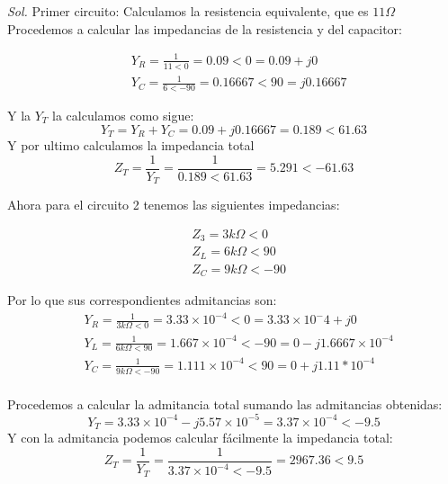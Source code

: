 \begin{enumerate}
	      \textit{ Sol. }
	      Primer circuito:
	      Calculamos la resistencia equivalente, que es $11\Omega$
	      Procedemos a calcular las impedancias de la resistencia y del capacitor:

	      \begin{align*}
		       & Y_R=\frac{1}{11<0}=0.09<0=0.09+j0       \\
		       & Y_C=\frac{1}{6<-90}=0.16667<90=j0.16667
	      \end{align*}

	      Y la $Y_T$ la calculamos como sigue:
	      \begin{equation}
		      Y_T=Y_R+Y_C=0.09+j0.16667=0.189<61.63
	      \end{equation}
	      Y por ultimo calculamos la impedancia total
	      \begin{equation}
		      Z_T=\frac{1}{Y_T}=\frac{1}{0.189<61.63}=5.291<-61.63
	      \end{equation}


	      Ahora para el circuito 2 tenemos las siguientes impedancias:

	      \begin{align*}
		       & Z_3=3k\Omega <0   \\
		       & Z_L=6k\Omega <90  \\
		       & Z_C=9k\Omega <-90
	      \end{align*}

	      Por lo que sus correspondientes admitancias son:
	      \begin{align*}
		       & Y_R=\frac{1}{3k\Omega <0}=3.33\times10^{-4}<0=3.33\times 10^-4+j0        \\
		       & Y_L=\frac{1}{6k\Omega<90}=1.667\times10^{-4}<-90=0-j1.6667\times 10^{-4} \\
		       & Y_C=\frac{1}{9k\Omega <-90}=1.111\times10^{-4}<90=0+j1.11*10^{-4}        \\
	      \end{align*}


	      Procedemos a calcular la admitancia total sumando las admitancias obtenidas:
	      \begin{equation}
		      Y_T=3.33\times10^{-4}-j5.57\times10^{-5}=3.37\times10^{-4}<-9.5
	      \end{equation}
	      Y con la admitancia podemos calcular fácilmente la impedancia total:
	      \begin{equation}
		      Z_T=\frac{1}{Y_T}=\frac{1}{3.37\times10^{-4}<-9.5}=2967.36<9.5     \end{equation}





\end{enumerate}
